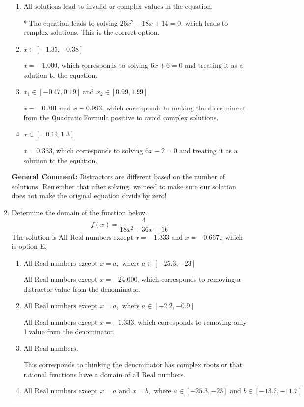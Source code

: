 \documentclass{extbook}[14pt]
\newcommand{\litem}[1]{\item #1

\rule{\textwidth}{0.4pt}}
\begin{document}
\begin{enumerate}
{\begin{enumerate}[label=\Alph*.]
$x = 0.333 \text{ and } x = -1.000$, which corresponds to solving $6x -2 = 0$ and $6x + 6 = 0$ and treating them as solutions to the equation.
\item \( \text{All solutions lead to invalid or complex values in the equation.} \)

* The equation leads to solving $26x^{2} -18 x + 14=0$, which leads to complex solutions. This is the correct option.
\item \( x \in [-1.35,-0.38] \)

$x = -1.000$, which corresponds to solving $6x + 6 = 0$ and treating it as a solution to the equation.
\item \( x_1 \in [-0.47, 0.19] \text{ and } x_2 \in [0.99,1.99] \)

$x = -0.301 \text{ and } x = 0.993$, which corresponds to making the discriminant from the Quadratic Formula positive to avoid complex solutions.
\item \( x \in [-0.19,1.3] \)

$x = 0.333$, which corresponds to solving $6x -2 = 0$ and treating it as a solution to the equation.
\end{enumerate}

\textbf{General Comment:} Distractors are different based on the number of solutions. Remember that after solving, we need to make sure our solution does not make the original equation divide by zero!
}
\litem{
Determine the domain of the function below.
\[ f(x) = \frac{4}{18x^{2} +36 x + 16} \]The solution is \( \text{All Real numbers except } x = -1.333 \text{ and } x = -0.667. \), which is option E.\begin{enumerate}[label=\Alph*.]
\item \( \text{All Real numbers except } x = a, \text{ where } a \in [-25.3, -23] \)

All Real numbers except $x = -24.000$, which corresponds to removing a distractor value from the denominator.
\item \( \text{All Real numbers except } x = a, \text{ where } a \in [-2.2, -0.9] \)

All Real numbers except $x = -1.333$, which corresponds to removing only 1 value from the denominator.
\item \( \text{All Real numbers.} \)

This corresponds to thinking the denominator has complex roots or that rational functions have a domain of all Real numbers.
\item \( \text{All Real numbers except } x = a \text{ and } x = b, \text{ where } a \in [-25.3, -23] \text{ and } b \in [-13.3, -11.7] \)


\end{enumerate}}
\end{enumerate}
\end{document}

